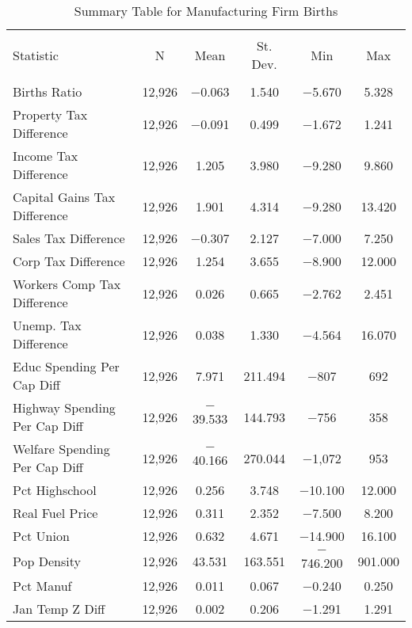 
\begin{table}[!htbp] \centering 
  \caption{Summary Table for  Manufacturing Firm Births} 
  \label{31-33summary} 
\begin{tabular}{@{\extracolsep{5pt}}lccccc} 
\\[-1.8ex]\hline 
\hline \\[-1.8ex] 
Statistic & \multicolumn{1}{c}{N} & \multicolumn{1}{c}{Mean} & \multicolumn{1}{c}{St. Dev.} & \multicolumn{1}{c}{Min} & \multicolumn{1}{c}{Max} \\ 
\hline \\[-1.8ex] 
Births Ratio & 12,926 & $-$0.063 & 1.540 & $-$5.670 & 5.328 \\ 
Property Tax Difference & 12,926 & $-$0.091 & 0.499 & $-$1.672 & 1.241 \\ 
Income Tax Difference & 12,926 & 1.205 & 3.980 & $-$9.280 & 9.860 \\ 
Capital Gains Tax Difference & 12,926 & 1.901 & 4.314 & $-$9.280 & 13.420 \\ 
Sales Tax Difference & 12,926 & $-$0.307 & 2.127 & $-$7.000 & 7.250 \\ 
Corp Tax Difference & 12,926 & 1.254 & 3.655 & $-$8.900 & 12.000 \\ 
Workers Comp Tax Difference & 12,926 & 0.026 & 0.665 & $-$2.762 & 2.451 \\ 
Unemp. Tax Difference & 12,926 & 0.038 & 1.330 & $-$4.564 & 16.070 \\ 
Educ Spending Per Cap Diff & 12,926 & 7.971 & 211.494 & $-$807 & 692 \\ 
Highway Spending Per Cap Diff & 12,926 & $-$39.533 & 144.793 & $-$756 & 358 \\ 
Welfare Spending Per Cap Diff & 12,926 & $-$40.166 & 270.044 & $-$1,072 & 953 \\ 
Pct Highschool & 12,926 & 0.256 & 3.748 & $-$10.100 & 12.000 \\ 
Real Fuel Price & 12,926 & 0.311 & 2.352 & $-$7.500 & 8.200 \\ 
Pct Union & 12,926 & 0.632 & 4.671 & $-$14.900 & 16.100 \\ 
Pop Density & 12,926 & 43.531 & 163.551 & $-$746.200 & 901.000 \\ 
Pct Manuf & 12,926 & 0.011 & 0.067 & $-$0.240 & 0.250 \\ 
Jan Temp Z Diff & 12,926 & 0.002 & 0.206 & $-$1.291 & 1.291 \\ 

\end{tabular}
\end{table}
